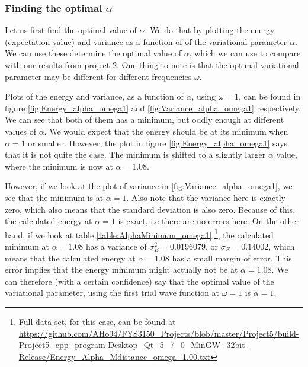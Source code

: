 \documentclass[12pt]{article}
\begin{document}
\subsubsection{Finding the optimal $\alpha$}
Let us first find the optimal value of $\alpha$. We do that by plotting the energy (expectation value) and variance as a function of of the variational parameter $\alpha$. We can use these determine the optimal value of $\alpha$, which we can use to compare with our results from project 2. One thing to note is that the optimal variational parameter may be different for different frequencies $\omega$.

Plots of the energy and variance, as a function of $\alpha$, using $\omega = 1$, can be found in figure \ref{fig:Energy_alpha_omega1} and \ref{fig:Variance_alpha_omega1} respectively. We can see that both of them has a minimum, but oddly enough at different values of $\alpha$. We would expect that the energy should be at its minimum when $\alpha = 1$ or smaller. However, the plot in figure \ref{fig:Energy_alpha_omega1} says that it is not quite the case. The minimum is shifted to a slightly larger $\alpha$ value, where the minimum is now at $\alpha = 1.08$.

However, if we look at the plot of variance in \ref{fig:Variance_alpha_omega1}, we see that the minimum is at $\alpha = 1$. Also note that the variance here is exactly zero, which also means that the standard deviation is also zero. Because of this, the calculated energy at $\alpha = 1$ is exact, i.e there are no errors here. On the other hand, if we look at table \ref{table:AlphaMinimum_omega1} \footnote{Full data set, for this case, can be found at \url{https://github.com/AHo94/FYS3150_Projects/blob/master/Project5/build-Project5_cpp_program-Desktop_Qt_5_7_0_MinGW_32bit-Release/Energy_Alpha_Mdistance_omega_1.00.txt}}, the calculated minimum at $\alpha=1.08$ has a variance of $\sigma_E^2 = 0.0196079$, or $\sigma_E = 0.14002$, which means that the calculated energy at $\alpha = 1.08$ has a small margin of error. This error implies that the energy minimum might actually not be at $\alpha = 1.08$. We can therefore (with a certain confidence) say that the optimal value of the variational parameter, using the first trial wave function at $\omega = 1$ is $\alpha = 1$.
\end{document}
